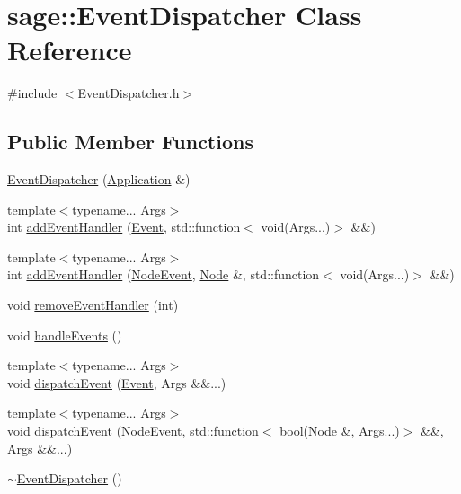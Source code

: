 \hypertarget{classsage_1_1EventDispatcher}{}\section{sage\+::Event\+Dispatcher Class Reference}
\label{classsage_1_1EventDispatcher}


{\ttfamily \#include $<$Event\+Dispatcher.\+h$>$}

\subsection*{Public Member Functions}
\begin{DoxyCompactItemize}
\item 
\mbox{\hyperlink{classsage_1_1EventDispatcher_aa80c440a5ba6379d084f616417ce0958}{Event\+Dispatcher}} (\mbox{\hyperlink{classsage_1_1Application}{Application}} \&)
\item 
{\footnotesize template$<$typename... Args$>$ }\\int \mbox{\hyperlink{classsage_1_1EventDispatcher_a871869f2a078e81c20a220a633d4e471}{add\+Event\+Handler}} (\mbox{\hyperlink{namespacesage_afe706a25026cc74fe69b56d53a265d29}{Event}}, std\+::function$<$ void(Args...)$>$ \&\&)
\item 
{\footnotesize template$<$typename... Args$>$ }\\int \mbox{\hyperlink{classsage_1_1EventDispatcher_a730d8eaf8806453d30dede2150b60071}{add\+Event\+Handler}} (\mbox{\hyperlink{namespacesage_ad2c7b0e1ebf67f572d43620e6b07aa13}{Node\+Event}}, \mbox{\hyperlink{classsage_1_1Node}{Node}} \&, std\+::function$<$ void(Args...)$>$ \&\&)
\item 
void \mbox{\hyperlink{classsage_1_1EventDispatcher_a79f655113b28c14ee6a86fa5ed7ec238}{remove\+Event\+Handler}} (int)
\item 
void \mbox{\hyperlink{classsage_1_1EventDispatcher_af94b0101f87f16334c1d32ea7a43c02a}{handle\+Events}} ()
\item 
{\footnotesize template$<$typename... Args$>$ }\\void \mbox{\hyperlink{classsage_1_1EventDispatcher_a096c6d68c684bb49ec1f8055c0e2a2d9}{dispatch\+Event}} (\mbox{\hyperlink{namespacesage_afe706a25026cc74fe69b56d53a265d29}{Event}}, Args \&\&...)
\item 
{\footnotesize template$<$typename... Args$>$ }\\void \mbox{\hyperlink{classsage_1_1EventDispatcher_a80201aec738c2f1aaa5b812f867f28fd}{dispatch\+Event}} (\mbox{\hyperlink{namespacesage_ad2c7b0e1ebf67f572d43620e6b07aa13}{Node\+Event}}, std\+::function$<$ bool(\mbox{\hyperlink{classsage_1_1Node}{Node}} \&, Args...)$>$ \&\&, Args \&\&...)
\item 
\mbox{\hyperlink{classsage_1_1EventDispatcher_abb5f401014e87f03027d6c4450964e55}{$\sim$\+Event\+Dispatcher}} ()
\end{DoxyCompactItemize}
